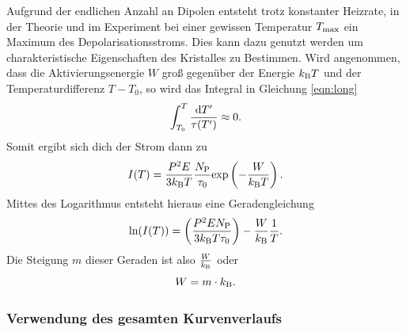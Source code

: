 				Aufgrund der endlichen Anzahl an Dipolen entsteht trotz konstanter Heizrate, in der Theorie und im Experiment bei einer gewissen Temperatur $T_{\text{max}}$ ein Maximum des Depolarisationsstroms.
				Dies kann dazu genutzt werden um charakteristische Eigenschaften des Kristalles zu Bestimmen.
				Wird angenommen, dass die Aktivierungsenergie $W$ groß gegenüber der Energie $k_{\text{B}}T$ und der Temperaturdifferenz $T-T_0$, so wird das Integral in Gleichung \ref{eqn:long} 
				\begin{equation}
					\int_{T_0}^T\frac{\text{d}T'}{\tau(T')} \approx 0.
				\end{equation}
				Somit ergibt sich dich der Strom dann zu
				\begin{equation}
					I(T) = \frac{P^2E}{3k_{\text{B}}T}\frac{N_{\text{P}}}{\tau_0} \text{exp}\left(-\frac{W}{k_{\text{B}}T}\right).
				\end{equation}	
				Mittes des Logarithmus entsteht hieraus eine Geradengleichung
				\begin{equation}
					\text{ln}(I(T)) = \left(\frac{P^2EN_{\text{P}}}{3k_{\text{B}}T\tau_0}\right) - \frac{W}{k_{\text{B}}} \frac{1}{T}.
				\end{equation}
				Die Steigung $m$ dieser Geraden ist also $\frac{W}{k_{\text{B}}}$ oder
				\begin{equation}
					W = m \cdot k_{\text{B}}.
					\label{eqn:W}
				\end{equation}

		\subsubsection{Verwendung des gesamten Kurvenverlaufs}

